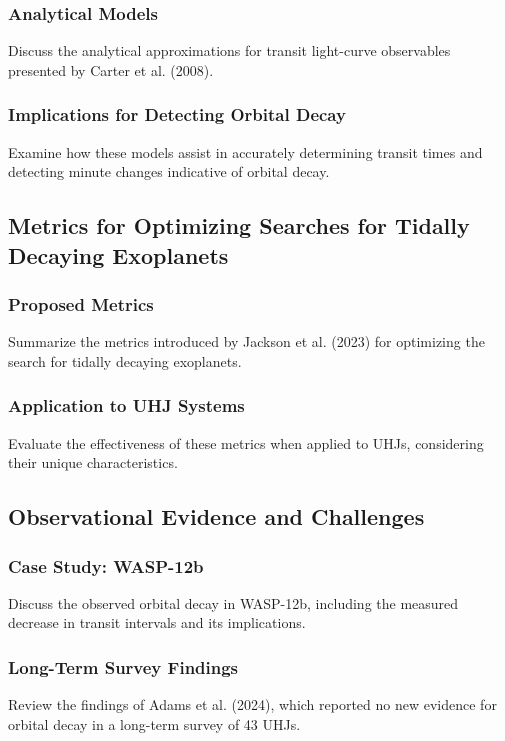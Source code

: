 \documentclass[oneside,12pt]{amsart}
\numberwithin{page}{section}
\begin{document}
\subsubsection{Analytical Models}
Discuss the analytical approximations for transit light-curve observables presented by Carter et al. (2008).

\subsubsection{Implications for Detecting Orbital Decay}
Examine how these models assist in accurately determining transit times and detecting minute changes indicative of orbital decay.


\subsection{Metrics for Optimizing Searches for Tidally Decaying Exoplanets}

\subsubsection{Proposed Metrics}
Summarize the metrics introduced by Jackson et al. (2023) for optimizing the search for tidally decaying exoplanets.

\subsubsection{Application to UHJ Systems}
Evaluate the effectiveness of these metrics when applied to UHJs, considering their unique characteristics.


\subsection{Observational Evidence and Challenges}

\subsubsection{Case Study: WASP-12b}
Discuss the observed orbital decay in WASP-12b, including the measured decrease in transit intervals and its implications. 

\subsubsection{Long-Term Survey Findings}
Review the findings of Adams et al. (2024), which reported no new evidence for orbital decay in a long-term survey of 43 UHJs.
\end{document}
